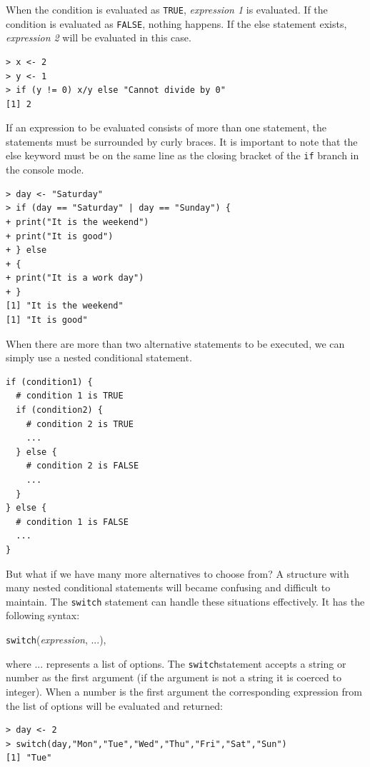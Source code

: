 When the condition is evaluated as \texttt{TRUE}, \textit{expression 1} is evaluated. If the
condition is evaluated as \texttt{FALSE}, nothing happens. If the else statement exists,
\textit{expression 2} will be evaluated in this case.

\begin{verbatim}
> x <- 2
> y <- 1
> if (y != 0) x/y else "Cannot divide by 0"
[1] 2
\end{verbatim}

If an expression to be evaluated consists of more than one statement, the
statements must be surrounded by curly braces. It is important to note that the
else keyword must be on the same line as the closing bracket of the \texttt{if} branch
in the console mode.

\begin{verbatim}
> day <- "Saturday"
> if (day == "Saturday" | day == "Sunday") {
+ print("It is the weekend")
+ print("It is good")
+ } else
+ {
+ print("It is a work day")
+ }
[1] "It is the weekend"
[1] "It is good"
\end{verbatim}

When there are more than two alternative statements to be executed, we can
simply use a nested conditional statement.

\begin{verbatim}
if (condition1) {
  # condition 1 is TRUE
  if (condition2) {
    # condition 2 is TRUE
    ...
  } else {
    # condition 2 is FALSE
    ...
  }
} else {
  # condition 1 is FALSE
  ...
}
\end{verbatim}

But what if we have many more alternatives to choose from? A structure
with many nested conditional statements will became confusing and difficult to
maintain. The \texttt{switch} statement can handle these situations effectively. It has
the following syntax:

\begin{center}
    \texttt{switch}(\textit{expression}, ...),
\end{center}

where ... represents a list of options. The \texttt{switch}statement accepts a string
or number as the first argument (if the argument is not a string it is coerced to
integer). When a number is the first argument the corresponding expression from
the list of options will be evaluated and returned:

\begin{verbatim}
> day <- 2
> switch(day,"Mon","Tue","Wed","Thu","Fri","Sat","Sun")
[1] "Tue"
\end{verbatim}

